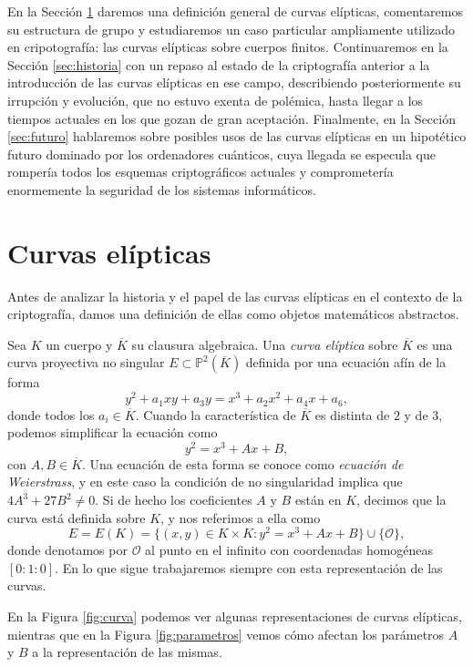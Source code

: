 \documentclass[
  a4paper,
  12pt,
  spanish,
]{scrartcl}
\begin{document}
En la Sección \ref{sec:curvas} daremos una definición general de curvas elípticas, comentaremos su estructura de grupo y estudiaremos un caso particular ampliamente utilizado en cripotografía: las curvas elípticas sobre cuerpos finitos. Continuaremos en la Sección \ref{sec:historia} con un repaso al estado de la criptografía anterior a la introducción de las curvas elípticas en ese campo, describiendo posteriormente su irrupción y evolución, que no estuvo exenta de polémica, hasta llegar a los tiempos actuales en los que gozan de gran aceptación. Finalmente, en la Sección \ref{sec:futuro} hablaremos sobre posibles usos de las curvas elípticas en un hipotético futuro dominado por los ordenadores cuánticos, cuya llegada se especula que rompería todos los esquemas criptográficos actuales y comprometería enormemente la seguridad de los sistemas informáticos.




\section{Curvas elípticas}
\label{sec:curvas}

Antes de analizar la historia y el papel de las curvas elípticas en el contexto de la criptografía, damos una definición de ellas como objetos matemáticos abstractos.

    Sea $K$ un cuerpo y $\overline{K}$ su clausura algebraica. Una \textit{curva elíptica} sobre $\overline{K}$ es una curva proyectiva no singular $E \subset \mathbb{P}^2(\overline{K})$ definida por una ecuación afín de la forma \[ y^2 + a_1xy + a_3y = x^3 +a_2x^2 + a_4x + a_6, \] donde todos los $a_i \in \overline{K}$.
    Cuando la característica de $\overline{K}$ es distinta de $2$ y de $3$, podemos simplificar la ecuación como \[ y^2 = x^3 + Ax + B, \] con $A,B \in \overline{K}$. Una ecuación de esta forma se conoce como \textit{ecuación de Weierstrass}, y en este caso la condición de no singularidad implica que $4A^3 + 27B^2 \neq 0$. Si de hecho los coeficientes $A$ y $B$ están en $K$, decimos que la curva está definida sobre $K$, y nos referimos a ella como \[ E = E(K) = \{ (x, y) \in K \times K : y^2 = x^3 + Ax + B\} \cup \{\mathcal{O}\}, \] donde denotamos por $\mathcal{O}$ al punto en el infinito con coordenadas homogéneas $[0:1:0]$. En lo que sigue trabajaremos siempre con esta representación de las curvas.

En la Figura \ref{fig:curva} podemos ver algunas representaciones de curvas elípticas, mientras que en la Figura \ref{fig:parametros} vemos cómo afectan los parámetros $A$ y $B$ a la representación de las mismas.
\end{document}
